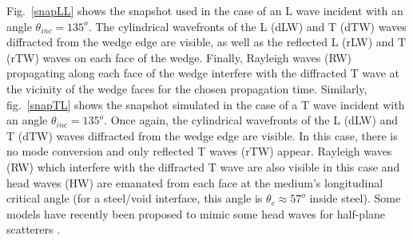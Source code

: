 Fig.~\ref{snapLL} shows the snapshot used in the case of an L wave incident with an angle $\theta_{inc}=135^o$. The cylindrical wavefronts of the L (dLW) and T (dTW) waves diffracted from the wedge edge are visible, as well as the reflected L (rLW) and T (rTW) waves on each face of the wedge. Finally, Rayleigh waves (RW) propagating along each face of the wedge interfere with the diffracted T wave at the vicinity of the wedge faces for the chosen propagation time. 
Similarly, fig.~\ref{snapTL} shows the snapshot simulated in the case of a T wave incident with an angle $\theta_{inc}=135^o$. Once again, the cylindrical wavefronts of the L (dLW) and T (dTW) waves diffracted from the wedge edge are visible. In this case, there is no mode conversion and only reflected T waves (rTW) appear. Rayleigh waves (RW) which interfere with the diffracted T wave are also visible in this case and head waves (HW) are emanated from each face at the medium's longitudinal critical angle (for a steel/void interface, this angle is $\theta_c \approx 57^o$  inside steel). Some models have recently been proposed to mimic some head waves for half-plane scatterers \cite{PTDdarmon, FradkinDarmon}.

